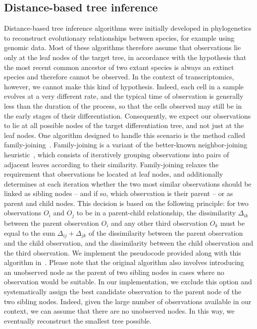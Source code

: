 \documentclass[pdflatex,sn-mathphys-num]{sn-jnl}%
\theoremstyle{thmstyleone}%
\theoremstyle{thmstyletwo}%
\theoremstyle{thmstylethree}%
\begin{document}
\subsection{Distance-based tree inference}\label{sec:fj}
Distance-based tree inference algorithms were initially developed in phylogenetics to reconstruct evolutionary relationships between species, for example using genomic data. Most of these algorithms therefore assume that observations lie only at the leaf nodes of the target tree, in accordance with the hypothesis that the most recent common ancestor of two extant species is always an extinct species and therefore cannot be observed. In the context of transcriptomics, however, we cannot make this kind of hypothesis. Indeed, each cell in a sample evolves at a very different rate, and the typical time of observation is generally less than the duration of the process, so that the cells observed may still be in the early stages of their differentiation. Consequently, we expect our observations to lie at all possible nodes of the target differentiation tree, and not just at the leaf nodes. One algorithm designed to handle this scenario is the method called family-joining~\cite{kalaghatgi_family_2016}. Family-joining is a variant of the better-known neighbor-joining heuristic~\cite{saitou_nj_1987}, which consists of iteratively grouping observations into pairs of adjacent leaves according to their similarity. Family-joining relaxes the requirement that observations be located at leaf nodes, and additionally determines at each iteration whether the two most similar observations should be linked as sibling nodes -- and if so, which observation is their parent -- or as parent and child nodes. This decision is based on the following principle: for two observations $O_i$ and $O_j$ to be in a parent-child relationship, the dissimilarity $\Delta_{ik}$ between the parent observation $O_i$ and any other third observation $O_k$ must be equal to the sum $\Delta_{ij}+\Delta_{jk}$ of the dissimilarity between the parent observation and the child observation, and the dissimilarity between the child observation and the third observation. We implement the pseudocode provided along with this algorithm in~\cite{kalaghatgi_family_2016}. Please note that the original algorithm also involves introducing an unobserved node as the parent of two sibling nodes in cases where no observation would be suitable. In our implementation, we exclude this option and systematically assign the best candidate observation to the parent node of the two sibling nodes. Indeed, given the large number of observations available in our context, we can assume that there are no unobserved nodes. In this way, we eventually reconstruct the smallest tree possible. 
\end{document}
